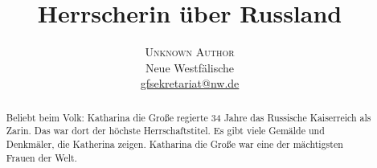 \documentclass[twoside]{article}
\title{\vspace{-15mm}\fontsize{24pt}{10pt}\selectfont\textbf{Herrscherin \"uber Russland}} %
\author{
\large
\textsc{Unknown Author}\\[2mm] %
\normalsize Neue Westf\"alische \\ %
\normalsize \href{mailto:gfsekretariat@nw.de}{gfsekretariat@nw.de} %
\vspace{-5mm}
}
\date{}
\begin{document}
\maketitle %

\thispagestyle{fancy} %


\begin{abstract}

\begin{center}
    \noindent Beliebt beim Volk: Katharina die Gro{\ss}e regierte 34 Jahre das Russische Kaiserreich
    als Zarin. Das war dort der h\"ochste Herrschaftstitel. Es gibt viele Gem\"alde und Denkm\"aler,
    die Katherina zeigen. Katharina die Gro{\ss}e war eine der m\"achtigsten Frauen der Welt.
\end{center}

\end{abstract}

\end{document}
